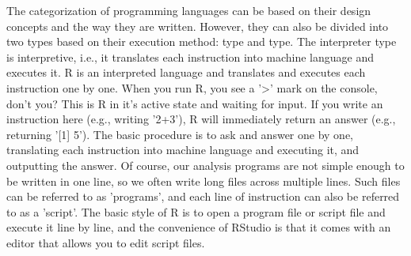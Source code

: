 \documentclass{ltjsbook}
\begin{document}
The categorization of programming languages can be based on their design concepts and the way they are written. However, they can also be divided into two types based on their execution method:  type and  type.
The interpreter type is interpretive, i.e., it translates each instruction into machine language and executes it. R is an interpreted language and translates and executes each instruction one by one. When you run R, you see a '>' mark on the console, don't you? This is R in it's active state and waiting for input. If you write an instruction here (e.g., writing '2+3'), R will immediately return an answer (e.g., returning '[1] 5'). The basic procedure is to ask and answer one by one, translating each instruction into machine language and executing it, and outputting the answer. Of course, our analysis programs are not simple enough to be written in one line, so we often write long files across multiple lines. Such files can be referred to as 'programs', and each line of instruction can also be referred to as a 'script'. The basic style of R is to open a program file or script file and execute it line by line, and the convenience of RStudio is that it comes with an editor that allows you to edit script files.
\end{document}
